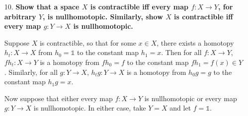 \documentclass[a4paper,12pt]{article}
\begin{document}
\begin{enumerate}
    \item[10.]
        \boldmath\textbf{Show that a space $X$ is contractible iff every map $f : X \to Y$, for arbitrary $Y$, is nullhomotopic. Similarly, show $X$ is contractible iff every map $g : Y \to X$ is nullhomotopic.
        }\unboldmath \par
        Suppose $X$ is contractible, so that for some $x \in X$, there exists a homotopy $h_t : X \to X$ from $h_0 = \mathds{1}$ to the constant map $h_1 = x$. Then for all $f : X \to Y$, $f h_t : X \to Y$ is a homotopy from $f h_0 = f$ to the constant map $f h_1 = f(x) \in Y$. Similarly, for all $g : Y \to X$, $h_t g : Y \to X$ is a homotopy from $h_0 g = g$ to the constant map $h_1 g = x$. \par
        Now suppose that either every map $f : X \to Y$ is nullhomotopic or every map $g : Y \to X$ is nullhomotopic. In either case, take $Y = X$ and let $f = \mathds{1}$.
\end{enumerate}
\end{document}
